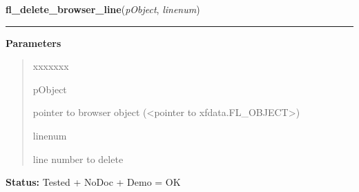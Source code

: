     \label{xformslib:library:fl_delete_browser_line}

    \vspace{0.5ex}

\hspace{.8\funcindent}\begin{boxedminipage}{\funcwidth}

    \raggedright \textbf{fl\_delete\_browser\_line}(\textit{pObject}, \textit{linenum})

    \vspace{-1.5ex}

    \rule{\textwidth}{0.5\fboxrule}
\setlength{\parskip}{2ex}
\setlength{\parskip}{1ex}
      \textbf{Parameters}
      \vspace{-1ex}

      \begin{quote}
        \begin{Ventry}{xxxxxxx}

          \item[pObject]

          pointer to browser object ({\textless}pointer to 
          xfdata.FL\_OBJECT{\textgreater})

          \item[linenum]

          line number to delete

        \end{Ventry}

      \end{quote}

\textbf{Status:} Tested + NoDoc + Demo = OK



    \end{boxedminipage}

    \label{xformslib:library:fl_replace_browser_line}

    \vspace{0.5ex}

